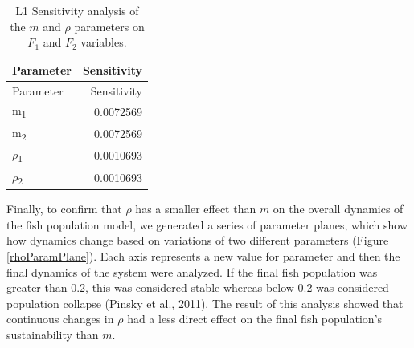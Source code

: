 \documentclass[
  12pt,
]{article}
\begin{document}
\begin{longtable}[]{@{}lr@{}}
\caption{\label{tab:Sensitivty}L1 Sensitivity analysis of the \(m\) and \(\rho\) parameters on \(F_1\) and \(F_2\) variables. \label{Sensitivity}}\tabularnewline
\toprule()
Parameter & Sensitivity \\
\midrule()
\endfirsthead
\toprule()
Parameter & Sensitivity \\
\midrule()
\endhead
m\textsubscript{1} & 0.0072569 \\
m\textsubscript{2} & 0.0072569 \\
\(\rho\)\textsubscript{1} & 0.0010693 \\
\(\rho\)\textsubscript{2} & 0.0010693 \\
\bottomrule()
\end{longtable}

Finally, to confirm that \(\rho\) has a smaller effect than \(m\) on the overall dynamics of the fish population model, we generated a series of parameter planes, which show how dynamics change based on variations of two different parameters (Figure \ref{rhoParamPlane}). Each axis represents a new value for parameter and then the final dynamics of the system were analyzed. If the final fish population was greater than 0.2, this was considered stable whereas below 0.2 was considered population collapse (Pinsky et al., 2011). The result of this analysis showed that continuous changes in \(\rho\) had a less direct effect on the final fish population's sustainability than \(m\).
\end{document}
